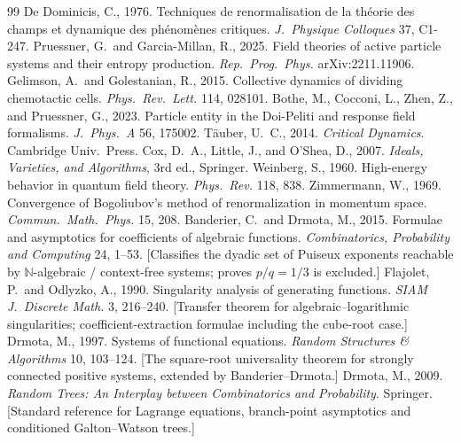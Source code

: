 \documentclass[11pt,a4paper]{article}
\theoremstyle{plain}
\theoremstyle{definition}
\begin{document}
\begin{thebibliography}{99}
 De Dominicis, C., 1976. Techniques de renormalisation de la th\'eorie des champs et dynamique des ph\'enom\`enes critiques. \textit{J.\ Physique Colloques} 37, C1-247.
 Pruessner, G.\ and Garcia-Millan, R., 2025. Field theories of active particle systems and their entropy production. \textit{Rep.\ Prog.\ Phys.} arXiv:2211.11906.
 Gelimson, A.\ and Golestanian, R., 2015. Collective dynamics of dividing chemotactic cells. \textit{Phys.\ Rev.\ Lett.} 114, 028101.
 Bothe, M., Cocconi, L., Zhen, Z., and Pruessner, G., 2023. Particle entity in the Doi-Peliti and response field formalisms. \textit{J.\ Phys.\ A} 56, 175002.
 T\"auber, U.~C., 2014. \textit{Critical Dynamics}. Cambridge Univ.\ Press.
 Cox, D.~A., Little, J., and O'Shea, D., 2007. \textit{Ideals, Varieties, and Algorithms}, 3rd ed., Springer.
 Weinberg, S., 1960. High-energy behavior in quantum field theory. \textit{Phys.\ Rev.} 118, 838.
 Zimmermann, W., 1969. Convergence of Bogoliubov's method of renormalization in momentum space. \textit{Commun.\ Math.\ Phys.} 15, 208.
 Banderier, C.\ and Drmota, M., 2015. Formulae and asymptotics for coefficients of algebraic functions. \textit{Combinatorics, Probability and Computing} 24, 1--53. [Classifies the dyadic set of Puiseux exponents reachable by $\mathbb{N}$-algebraic / context-free systems; proves $p/q=1/3$ is excluded.]
 Flajolet, P.\ and Odlyzko, A., 1990. Singularity analysis of generating functions. \textit{SIAM J.\ Discrete Math.} 3, 216--240. [Transfer theorem for algebraic--logarithmic singularities; coefficient-extraction formulae including the cube-root case.]
 Drmota, M., 1997. Systems of functional equations. \textit{Random Structures \& Algorithms} 10, 103--124. [The square-root universality theorem for strongly connected positive systems, extended by Banderier--Drmota.]
 Drmota, M., 2009. \textit{Random Trees: An Interplay between Combinatorics and Probability}. Springer. [Standard reference for Lagrange equations, branch-point asymptotics and conditioned Galton--Watson trees.]

\end{thebibliography}
\end{document}
